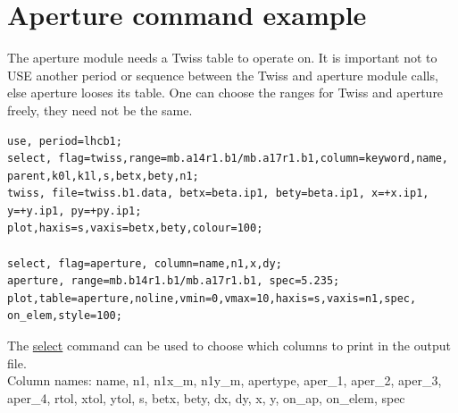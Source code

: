 


\section{Aperture command example}
The aperture module needs a Twiss table to operate on. It is important
not to USE another period or sequence between the Twiss and aperture
module calls, else aperture looses its table. One can choose the ranges
for Twiss and aperture freely, they need not be the same.  

\begin{verbatim}
use, period=lhcb1;
select, flag=twiss,range=mb.a14r1.b1/mb.a17r1.b1,column=keyword,name,
parent,k0l,k1l,s,betx,bety,n1;
twiss, file=twiss.b1.data, betx=beta.ip1, bety=beta.ip1, x=+x.ip1, 
y=+y.ip1, py=+py.ip1;
plot,haxis=s,vaxis=betx,bety,colour=100;

select, flag=aperture, column=name,n1,x,dy;
aperture, range=mb.b14r1.b1/mb.a17r1.b1, spec=5.235;
plot,table=aperture,noline,vmin=0,vmax=10,haxis=s,vaxis=n1,spec,
on_elem,style=100;
\end{verbatim}

The \href{../Introduction/select.html}{select} command can be  used to
choose which columns to print in the output file.   
\\ Column names: name, n1, n1x\_m, n1y\_m, apertype, aper\_1, aper\_2,
aper\_3, aper\_4, rtol, xtol, ytol, s, betx, bety, dx, dy, x, y, on\_ap,
on\_elem, spec  


